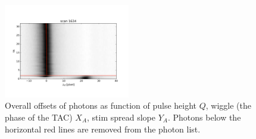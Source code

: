 \documentclass[12pt, preprint]{aastex}
\begin{document}
\begin{figure}[p]
\begin{center}
\includegraphics[width=0.49\textwidth]{figures/ya-y_tot}
\end{center}
\caption{%
  \label{meta}
  Overall offsets of photons as function of pulse height $Q$,  wiggle (the phase of the TAC)  $X_A$,  stim spread slope $Y_A$.
  Photons below the horizontal red lines are removed from the photon list.
  }
\end{figure}
\end{document}
